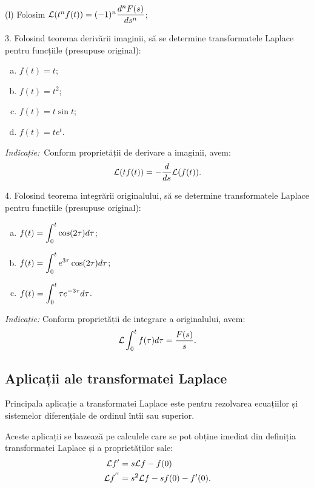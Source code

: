 (l) Folosim $ \mathcal{L}(t^n f(t)) = (-1)^n \dfrac{d^n F(s)}{ds^n} $;

\vspace{1cm}

3. Folosind teorema derivării imaginii, să se determine transformatele Laplace pentru funcțiile
(presupuse original):
\begin{enumerate}[(a)]
\item $ f(t) = t $;
\item $ f(t) = t^2 $;
\item $ f(t) = t\sin t $;
\item $ f(t) = te^t $.
\end{enumerate}

\emph{Indicație:} Conform proprietății de derivare a imaginii, avem:
\[
  \mathcal{L} (t f(t)) = -\frac{d}{ds} \mathcal{L} (f(t)).
\]

\vspace{1cm}

4. Folosind teorema integrării originalului, să se determine transformatele Laplace pentru
funcțiile (presupuse original):
\begin{enumerate}[(a)]
\item $ f(t) = \displaystyle\int_0^t \cos (2\tau) d\tau $;
\item $ f(t) = \displaystyle\int_0^t e^{3 \tau} \cos(2 \tau) d\tau $;
\item $ f(t) = \displaystyle\int_0^t \tau e^{-3\tau} d\tau $.
\end{enumerate}

\emph{Indicație:} Conform proprietății de integrare a originalului,
avem:
\[
  \mathcal{L} \int_0^t f(\tau) d\tau = \frac{F(s)}{s}.
\]



\subsection{Aplicații ale transformatei Laplace}

Principala aplicație a transformatei Laplace este pentru rezolvarea ecuațiilor și
sistemelor diferențiale de ordinul întîi sau superior.

Aceste aplicații se bazează pe calculele care se pot obține imediat din definiția
transformatei Laplace și a proprietăților sale:
\begin{align*}
  \mathcal{L} f' &= s \mathcal{L} f - f(0) \\
  \mathcal{L} f^{''} &= s^2 \mathcal{L} f - sf(0) - f'(0).
\end{align*}

